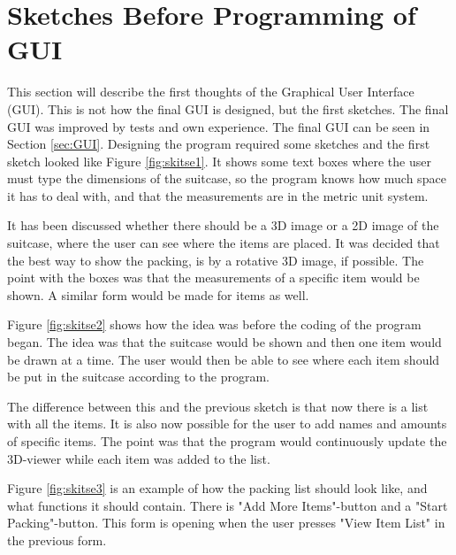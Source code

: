 \section{Sketches Before Programming of GUI}
\label{sec:sketches}
This section will describe the first thoughts of the Graphical User Interface (GUI). This is not how the final GUI is designed, but the first sketches. The final GUI was improved by tests and own experience. The final GUI can be seen in Section \ref{sec:GUI}.
Designing the program required some sketches and the first sketch looked like Figure \ref{fig:skitse1}.
It shows some text boxes where the user must type the dimensions of the suitcase, so the program knows how much space it has to deal with, and that the measurements are in the metric unit system.


It has been discussed whether there should be a 3D image or a 2D image of the suitcase, where the user can see where the items are placed. It was decided that the best way to show the packing, is by a rotative 3D image, if possible.
The point with the boxes was that the measurements of a specific item would be shown.
A similar form would be made for items as well.


Figure \ref{fig:skitse2} shows how the idea was before the coding of the program began. The idea was that the suitcase would be shown and then one item would be drawn at a time. The user would then be able to see where each item should be put in the suitcase according to the program.

The difference between this and the previous sketch is that now there is a list with all the items. It is also now possible for the user to add names and amounts of specific items. The point was that the program would continuously update the 3D-viewer while each item was added to the list.


Figure \ref{fig:skitse3} is an example of how the packing list should look like, and what functions it should contain.
There is "Add More Items"-button and a "Start Packing"-button. This form is opening when the user presses "View Item List" in the previous form.

